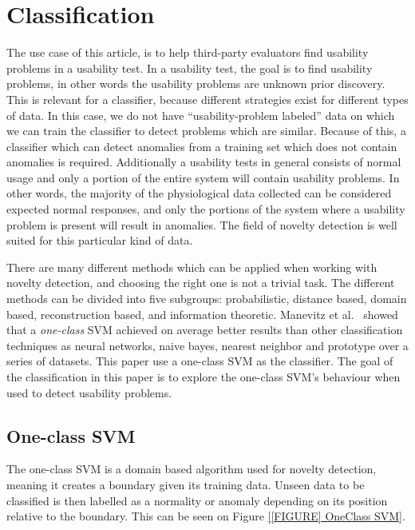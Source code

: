 \section{Classification}
The use case of this article, is to help third-party evaluators find usability problems in a usability test.
In a usability test, the goal is to find usability problems, in other words the usability problems are unknown prior discovery. This is relevant for a classifier, because different strategies exist for different types of data. In this case, we do not have ``usability-problem labeled'' data on which we can train the classifier to detect problems which are similar. Because of this, a classifier which can detect anomalies from a training set which does not contain anomalies is required.
Additionally a usability tests in general consists of normal usage and only a portion of the entire system will contain usability problems. In other words, the majority of the physiological data collected can be considered expected normal responses, and only the portions of the system where a usability problem is present will result in anomalies.
The field of novelty detection\cite{noveltyDetection} is well suited for this particular kind of data.

There are many different methods which can be applied when working with novelty detection\cite{noveltyDetection}, and choosing the right one is not a trivial task.
The different methods can be divided into five subgroups: probabilistic, distance based, domain based, reconstruction based, and information theoretic.
Manevitz et al.~\cite{oneClassSVM} showed that a \textit{one-class} SVM achieved on average better results than other classification techniques as neural networks, naive bayes, nearest neighbor and prototype over a series of datasets.
This paper use a one-class SVM as the classifier.
The goal of the classification in this paper is to explore the one-class SVM's behaviour when used to detect usability problems.

\subsection{One-class SVM}
The one-class SVM is a domain based algorithm used for novelty detection, meaning it creates a boundary given its training data.
Unseen data to be classified is then labelled as a normality or anomaly depending on its position relative to the boundary.
This can be seen on Figure \ref{[FIGURE] OneClass SVM}.

